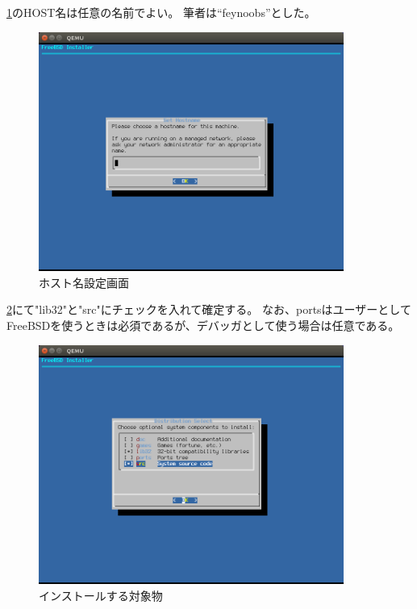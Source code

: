 \documentclass[a4j]{jarticle}
\begin{document}
\begin{multicols}{2}
\ref{fig:FreeBSD_HOST}のHOST名は任意の名前でよい。
筆者は``feynoobs''とした。
\begin{figure}[htbp]
	\begin{center}
    	\includegraphics[width=10cm]{./IMG/FreeBSD_HOST.png}
	\end{center}
    \caption{ホスト名設定画面}
    \label{fig:FreeBSD_HOST}
\end{figure}

\ref{fig:FreeBSD_INST_SELECT}にて"lib32"と"src"にチェックを入れて確定する。
なお、portsはユーザーとしてFreeBSDを使うときは必須であるが、デバッガとして使う場合は任意である。
\begin{figure}[htbp]
	\begin{center}
    	\includegraphics[width=10cm]{./IMG/FreeBSD_INST.png}
	\end{center}
    \caption{インストールする対象物}
    \label{fig:FreeBSD_INST_SELECT}
\end{figure}


\end{multicols}
\end{document}
